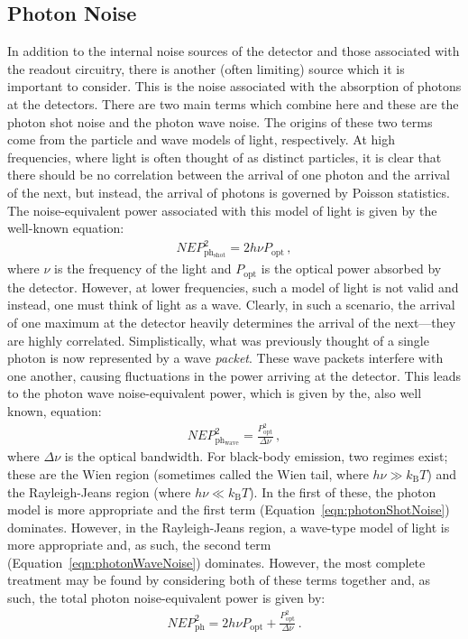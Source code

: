 \subsection{Photon Noise}\label{ssec:photonNoise}
In addition to the internal noise sources of the detector and those associated with the readout circuitry, there is another (often limiting) source which it is important to consider. This is the noise associated with the absorption of photons at the detectors. There are two main terms which combine here and these are the photon shot noise and the photon wave noise. The origins of these two terms come from the particle and wave models of light, respectively. At high frequencies, where light is often thought of as distinct particles, it is clear that there should be no correlation between the arrival of one photon and the arrival of the next, but instead, the arrival of photons is governed by Poisson statistics. The noise-equivalent power associated with this model of light is given by the well-known equation:
\begin{align}
\mathit{NEP}_{\mathrm{ph_{shot}}}^{2} = 2h\nu P_{\mathrm{opt}}\,,
	\label{eqn:photonShotNoise}
\end{align}
where $\nu$ is the frequency of the light and $P_{\mathrm{opt}}$ is the optical power absorbed by the detector. However, at lower frequencies, such a model of light is not valid and instead, one must think of light as a wave. Clearly, in such a scenario, the arrival of one maximum at the detector heavily determines the arrival of the next---they are highly correlated. Simplistically, what was previously thought of a single photon is now represented by a wave \textit{packet}. These wave packets interfere with one another, causing fluctuations in the power arriving at the detector. This leads to the photon wave noise-equivalent power, which is given by the, also well known, equation:
\begin{align}
\mathit{NEP}^{2}_{\mathrm{ph_{wave}}} 
	= \frac{P^{2}_{\mathrm{opt}}}{\Delta\nu}\,,
	\label{eqn:photonWaveNoise}
\end{align}
where $\Delta\nu$ is the optical bandwidth. For black-body emission, two regimes exist; these are the Wien region (sometimes called the Wien tail, where $h\nu \gg k_{\mathrm{B}}T$) and the Rayleigh-Jeans region (where $h\nu \ll k_{\mathrm{B}}T$). In the first of these, the photon model is more appropriate and the first term (Equation~\ref{eqn:photonShotNoise}) dominates. However, in the Rayleigh-Jeans region, a wave-type model of light is more appropriate and, as such, the second term (Equation~\ref{eqn:photonWaveNoise}) dominates. However, the most complete treatment may be found by considering both of these terms together and, as such, the total photon noise-equivalent power is given by:
\begin{align}
\mathit{NEP}_{\mathrm{ph}}^{2} = 2h\nu P_{\mathrm{opt}} + \frac{P_{\mathrm{opt}}^{2}}{\Delta \nu}\,.
	\label{eqn:photonNoise}
\end{align}
